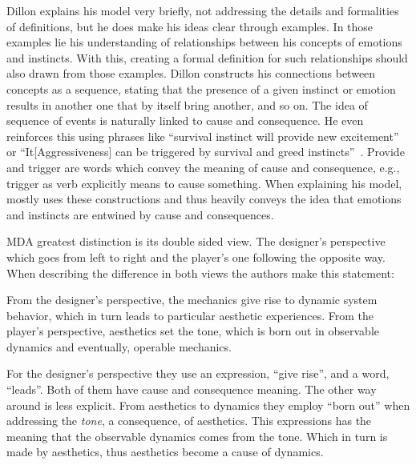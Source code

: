 Dillon explains his model very briefly, not addressing the details and formalities of definitions, but he does make his ideas clear through examples. In those examples lie
 his understanding of relationships between his concepts of emotions and instincts. With this, creating a formal definition for such relationships should also drawn from those examples. Dillon constructs his connections between concepts as a sequence, stating that the presence of a given instinct or emotion results in another one that by itself bring another, and so on. The idea of sequence of events is naturally linked to cause and consequence. He even reinforces this using phrases like ``survival instinct will provide new excitement''~\citep[p. 13]{dillon_way_2010} or ``It[Aggressiveness] can be triggered by survival and greed instincts''~\citep[p. 14]{dillon_way_2010}. Provide and trigger are words which convey the meaning of cause and consequence, e.g., trigger as verb explicitly means to cause something. When explaining his model, \citet{dillon_way_2010} mostly uses these constructions and thus heavily conveys  the idea that emotions and instincts are entwined by cause and consequences. 

MDA greatest distinction is its double sided view. The designer's perspective which goes from left to right and the player's one following the opposite way. When describing the difference in both views the authors make this statement: 

\begin{citacao}
From the designer's perspective, the mechanics give rise to
dynamic system behavior, which in turn leads to particular
aesthetic experiences. From the player's perspective,
aesthetics set the tone, which is born out in observable
dynamics and eventually, operable mechanics.
\cite{Hunicke2004}
\end{citacao}


For the designer's perspective they use an expression, ``give rise'', and a word, ``leads''. Both of them have cause and consequence meaning. The other way around is less explicit. From aesthetics to dynamics they employ ``born out'' when addressing the \textit{tone}, a consequence, of aesthetics. This expressions has the meaning that the observable dynamics comes from the tone. Which in turn is made by aesthetics, thus aesthetics become a cause of dynamics. 

